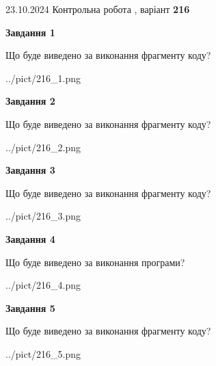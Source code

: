 \documentclass[12pt, ukrainian]{article}
\begin{document}
{\Large{23.10.2024 Контрольна робота , варіант  \No \textbf { 216 }\par}}
{
\begin {large}
{\begin {center}\textbf{Завдання 1}\end {center}}

Що буде виведено за виконання фрагменту коду?\par
\begin{center}
	{../pict/216_1.png}
\end{center}
\newpage

{\begin {center}\textbf{Завдання 2}\end {center}}

Що буде виведено за виконання фрагменту коду?\par
\begin{center}
	{../pict/216_2.png}
\end{center}
\newpage

{\begin {center}\textbf{Завдання 3}\end {center}}

Що буде виведено за виконання фрагменту коду?\par
\begin{center}
	{../pict/216_3.png}
\end{center}
\newpage

{\begin {center}\textbf{Завдання 4}\end {center}}

Що буде виведено за виконання програми?\par
\begin{center}
	{../pict/216_4.png}
\end{center}
\newpage

{\begin {center}\textbf{Завдання 5}\end {center}}

Що буде виведено за виконання фрагменту коду?\par
\begin{center}
	{../pict/216_5.png}
\end{center}
\newpage


\end{large}}
\end{document}
